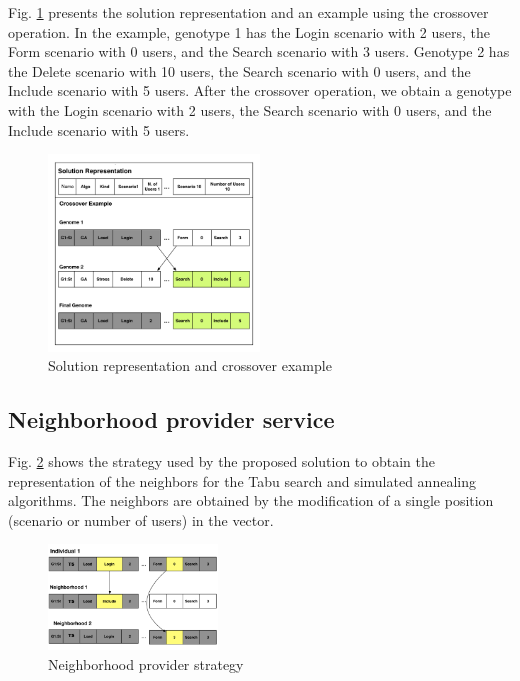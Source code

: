 Fig. \ref{fig:genomarepresentation} presents the solution representation and an example using the crossover operation. In the example, genotype 1 has the Login scenario with 2 users, the Form scenario with 0 users, and the Search scenario with 3 users. Genotype 2 has the Delete scenario with 10 users, the Search scenario with 0 users, and the Include scenario with 5 users. After the crossover operation, we obtain a genotype with the Login scenario with 2 users, the Search scenario with 0 users, and the Include scenario with 5 users.

\begin{figure}[h]
\centering
\includegraphics[width=0.5\textwidth]{./images/genomerepresentation1.png}
\caption{Solution representation and crossover example}
\label{fig:genomarepresentation}
\end{figure}


\subsection{Neighborhood provider service}


Fig. \ref{fig:neighbourtaby} shows the strategy used by the proposed solution to obtain the representation of the neighbors for the Tabu search and simulated annealing algorithms. The neighbors are obtained by the modification of a single position (scenario or number of users) in the vector.


\begin{figure}[h]
\centering
\includegraphics[width=0.4\textwidth]{./images/neighbor.png}
\caption{Neighborhood provider strategy}
\label{fig:neighbourtaby}
\end{figure}



